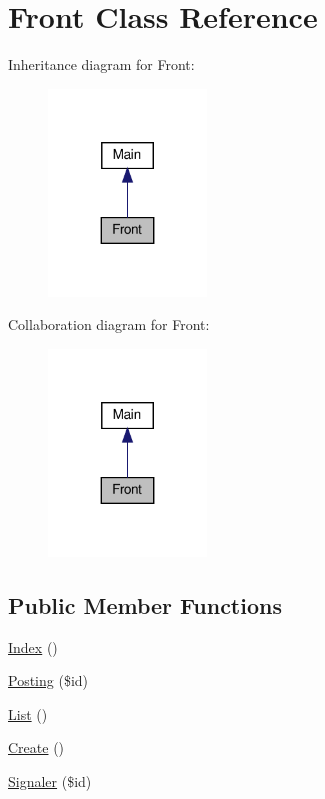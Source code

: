 \hypertarget{class_src_1_1_controllers_1_1_front}{}\section{Front Class Reference}
\label{class_src_1_1_controllers_1_1_front}


Inheritance diagram for Front\+:
\nopagebreak
\begin{figure}[H]
\begin{center}
\leavevmode
\includegraphics[width=119pt]{class_src_1_1_controllers_1_1_front__inherit__graph}
\end{center}
\end{figure}


Collaboration diagram for Front\+:
\nopagebreak
\begin{figure}[H]
\begin{center}
\leavevmode
\includegraphics[width=119pt]{class_src_1_1_controllers_1_1_front__coll__graph}
\end{center}
\end{figure}
\subsection*{Public Member Functions}
\begin{DoxyCompactItemize}
\item 
\hyperlink{class_src_1_1_controllers_1_1_front_ac36db983080e1b0934908febca5de2d9}{Index} ()
\item 
\hyperlink{class_src_1_1_controllers_1_1_front_a5fcbe325afb03acc6e4eaec38a7bb1ae}{Posting} (\$id)
\item 
\hyperlink{class_src_1_1_controllers_1_1_front_a17e6c90f14225bdac5c65ed915b0a2f6}{List} ()
\item 
\hyperlink{class_src_1_1_controllers_1_1_front_ad01f71fa0ecc039494e3c282864298c3}{Create} ()
\item 
\hyperlink{class_src_1_1_controllers_1_1_front_a8b22c40bd1737bbb7db0816b7e9763b3}{Signaler} (\$id)
\end{DoxyCompactItemize}
